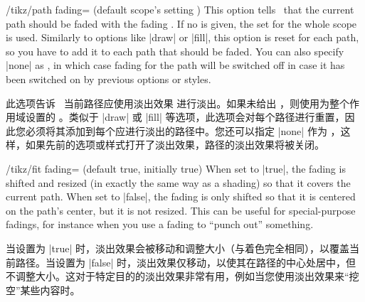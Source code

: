 \begin{key}{/tikz/path fading= (default \normalfont scope's setting  )}
    This option tells \tikzname\ that the current path should be faded with the
    fading . If no  is given, the  set for the
    whole scope is used. Similarly to options like |draw| or |fill|, this
    option is reset for each path, so you have to add it to each path that
    should be faded. You can also specify |none| as , in which case
    fading for the path will be switched off in case it has been switched on by
    previous options or styles.
    
    此选项告诉 \tikzname\ 当前路径应使用淡出效果  进行淡出。如果未给出 ，则使用为整个作用域设置的 。类似于 |draw| 或 |fill| 等选项，此选项会对每个路径进行重置，因此您必须将其添加到每个应进行淡出的路径中。您还可以指定 |none| 作为 ，这样，如果先前的选项或样式打开了淡出效果，路径的淡出效果将被关闭。


\begin{codeexample}[preamble={\usetikzlibrary{fadings,patterns}}]
\end{codeexample}

    \begin{key}{/tikz/fit fading= (default true, initially true)}
        When set to |true|, the fading is shifted and resized (in exactly the
        same way as a shading) so that it covers the current path. When set to
        |false|, the fading is only shifted so that it is centered on the
        path's center, but it is not resized. This can be useful for
        special-purpose fadings, for instance when you use a fading to ``punch
        out'' something.

        当设置为 |true| 时，淡出效果会被移动和调整大小（与着色完全相同），以覆盖当前路径。当设置为 |false| 时，淡出效果仅移动，以使其在路径的中心处居中，但不调整大小。这对于特定目的的淡出效果非常有用，例如当您使用淡出效果来“挖空”某些内容时。


\end{key}
\end{key}
